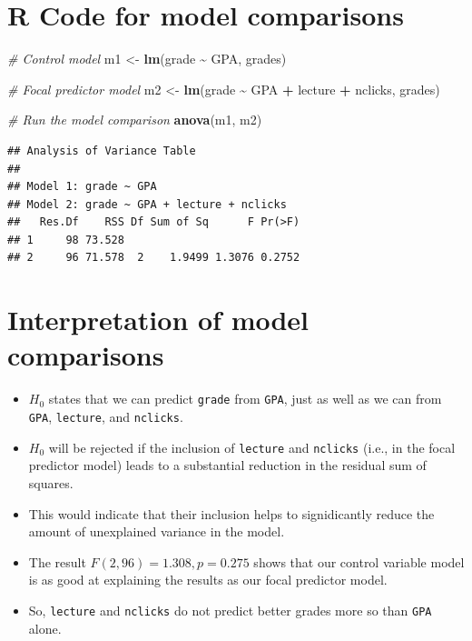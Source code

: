 \documentclass[
]{article}
\newenvironment{Shaded}{\begin{snugshade}}{\end{snugshade}}
\newcommand{\CommentTok}[1]{\textcolor[rgb]{0.56,0.35,0.01}{\textit{#1}}}
\newcommand{\FunctionTok}[1]{\textcolor[rgb]{0.13,0.29,0.53}{\textbf{#1}}}
\newcommand{\NormalTok}[1]{#1}
\newcommand{\OtherTok}[1]{\textcolor[rgb]{0.56,0.35,0.01}{#1}}
\newcommand{\SpecialCharTok}[1]{\textcolor[rgb]{0.81,0.36,0.00}{\textbf{#1}}}
\providecommand{\tightlist}{%
  \setlength{\itemsep}{0pt}\setlength{\parskip}{0pt}}
\begin{document}
\hypertarget{r-code-for-model-comparisons}{%
\section{R Code for model
comparisons}\label{r-code-for-model-comparisons}}

\begin{Shaded}
\begin{Highlighting}[]
\CommentTok{\# Control model}
\NormalTok{m1 }\OtherTok{\textless{}{-}} 
  \FunctionTok{lm}\NormalTok{(grade }\SpecialCharTok{\textasciitilde{}}\NormalTok{ GPA, grades) }

\CommentTok{\# Focal predictor model}
\NormalTok{m2 }\OtherTok{\textless{}{-}} 
  \FunctionTok{lm}\NormalTok{(grade }\SpecialCharTok{\textasciitilde{}}\NormalTok{ GPA }\SpecialCharTok{+}\NormalTok{ lecture }\SpecialCharTok{+}\NormalTok{ nclicks, grades) }

\CommentTok{\# Run the model comparison}
\FunctionTok{anova}\NormalTok{(m1, m2)}
\end{Highlighting}
\end{Shaded}

\begin{verbatim}
## Analysis of Variance Table
## 
## Model 1: grade ~ GPA
## Model 2: grade ~ GPA + lecture + nclicks
##   Res.Df    RSS Df Sum of Sq      F Pr(>F)
## 1     98 73.528                           
## 2     96 71.578  2    1.9499 1.3076 0.2752
\end{verbatim}

\hypertarget{interpretation-of-model-comparisons}{%
\section{Interpretation of model
comparisons}\label{interpretation-of-model-comparisons}}

\begin{itemize}
\tightlist
\item
  \(H_0\) states that we can predict \texttt{grade} from \texttt{GPA},
  just as well as we can from \texttt{GPA}, \texttt{lecture}, and
  \texttt{nclicks}.
\item
  \(H_0\) will be rejected if the inclusion of \texttt{lecture} and
  \texttt{nclicks} (i.e., in the focal predictor model) leads to a
  substantial reduction in the residual sum of squares.
\item
  This would indicate that their inclusion helps to signidicantly reduce
  the amount of unexplained variance in the model.
\item
  The result \(F(2,96) = 1.308, p = 0.275\) shows that our control
  variable model is as good at explaining the results as our focal
  predictor model.
\item
  So, \texttt{lecture} and \texttt{nclicks} do not predict better grades
  more so than \texttt{GPA} alone.
\end{itemize}
\end{document}
